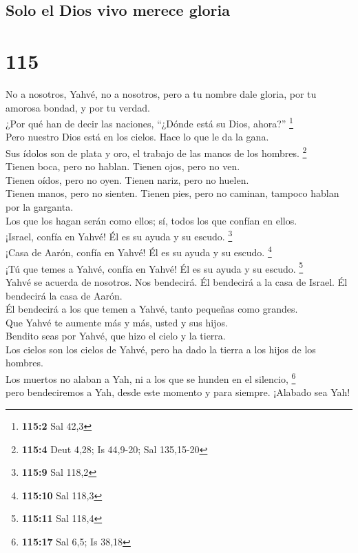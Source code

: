 \hypertarget{solo-el-dios-vivo-merece-gloria}{%
\subsection{Solo el Dios vivo merece
gloria}\label{solo-el-dios-vivo-merece-gloria}}

\hypertarget{section-112}{%
\section{115}\label{section-112}}

 No a nosotros, Yahvé, no a nosotros, pero a tu nombre
dale gloria, por tu amorosa bondad, y por tu verdad.\\
 ¿Por qué han de decir las naciones, ``¿Dónde está su
Dios, ahora?'' \footnote{\textbf{115:2} Sal 42,3}\\
 Pero nuestro Dios está en los cielos. Hace lo que le da
la gana.\\
 Sus ídolos son de plata y oro, el trabajo de las manos de
los hombres. \footnote{\textbf{115:4} Deut 4,28; Is 44,9-20; Sal
  135,15-20}\\
 Tienen boca, pero no hablan. Tienen ojos, pero no ven.\\
 Tienen oídos, pero no oyen. Tienen nariz, pero no
huelen.\\
 Tienen manos, pero no sienten. Tienen pies, pero no
caminan, tampoco hablan por la garganta.\\
 Los que los hagan serán como ellos; sí, todos los que
confían en ellos.\\
 ¡Israel, confía en Yahvé! Él es su ayuda y su escudo.
\footnote{\textbf{115:9} Sal 118,2}\\
 ¡Casa de Aarón, confía en Yahvé! Él es su ayuda y su
escudo. \footnote{\textbf{115:10} Sal 118,3}\\
 ¡Tú que temes a Yahvé, confía en Yahvé! Él es su ayuda y
su escudo. \footnote{\textbf{115:11} Sal 118,4}\\
 Yahvé se acuerda de nosotros. Nos bendecirá. Él
bendecirá a la casa de Israel. Él bendecirá la casa de Aarón.\\
 Él bendecirá a los que temen a Yahvé, tanto pequeñas
como grandes.\\
 Que Yahvé te aumente más y más, usted y sus hijos.\\
 Bendito seas por Yahvé, que hizo el cielo y la tierra.\\
 Los cielos son los cielos de Yahvé, pero ha dado la
tierra a los hijos de los hombres.\\
 Los muertos no alaban a Yah, ni a los que se hunden en
el silencio, \footnote{\textbf{115:17} Sal 6,5; Is 38,18}\\
 pero bendeciremos a Yah, desde este momento y para
siempre. ¡Alabado sea Yah!

